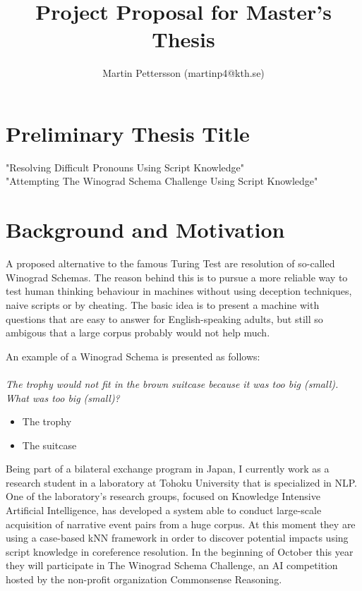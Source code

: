 \documentclass{article}
\begin{document}
\title{Project Proposal for Master's Thesis}
\author{Martin Pettersson (martinp4@kth.se)}
\maketitle

\section{Preliminary Thesis Title}
"Resolving Difficult Pronouns Using Script Knowledge"\\
"Attempting The Winograd Schema Challenge Using Script Knowledge"

\section{Background and Motivation}
A proposed alternative to the famous Turing Test are resolution of so-called Winograd Schemas. The reason behind this is to pursue a more reliable way to test human thinking behaviour in machines without using deception techniques, naive scripts or by cheating. The basic idea is to present a machine with questions that are easy to answer for English-speaking adults, but still so ambigous that a large corpus probably would not help much. 

An example of a Winograd Schema is presented as follows:
\\ \\
{\it The trophy would not fit in the brown suitcase because it was too big (small). What was too big (small)?}
\begin{itemize}
  \item The trophy
  \item The suitcase
\end{itemize}
Being part of a bilateral exchange program in Japan, I currently work as a research student in a laboratory at Tohoku University that is specialized in NLP. One of the laboratory's research groups, focused on Knowledge Intensive Artificial Intelligence, has developed a system able to conduct large-scale acquisition of narrative event pairs from a huge corpus. At this moment they are using a case-based kNN framework in order to discover potential impacts using script knowledge in coreference resolution. In the beginning of October this year they will participate in The Winograd Schema Challenge, an AI competition hosted by the non-profit organization Commonsense Reasoning.
\end{document}

